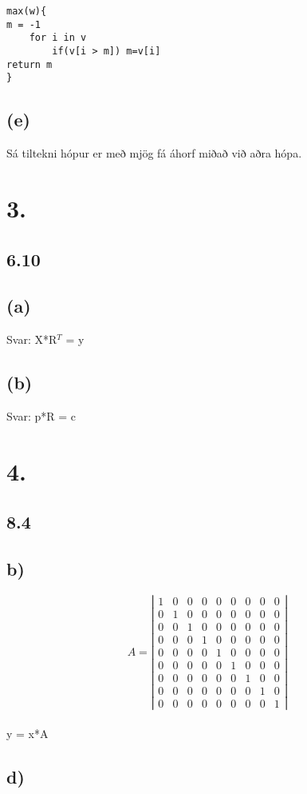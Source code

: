 \documentclass[]{article}
\begin{document}
\begin{lstlisting}
max(w){
m = -1
	for i in v 	
		if(v[i > m]) m=v[i]
return m
}
\end{lstlisting}


\pagebreak

\subsection*{(e)}
Sá tiltekni hópur er með mjög fá áhorf miðað við aðra hópa.


\section*{3.}

\subsection*{6.10}

\subsection*{(a)}

Svar: X*R$ ^{T} $ = y

\subsection*{(b)}

Svar: p*R = c

\section*{4.}

\subsection*{8.4}

\subsection*{b)}

 
\[ A = \left| \begin{array}{ccccccccc}
1 & 0 & 0 & 0 & 0 & 0 & 0 & 0 & 0 \\
0 & 1 & 0 & 0 & 0 & 0 & 0 & 0 & 0 \\
0 & 0 & 1 & 0 & 0 & 0 & 0 & 0 & 0 \\
0 & 0 & 0 & 1 & 0 & 0 & 0 & 0 & 0 \\
0 & 0 & 0 & 0 & 1 & 0 & 0 & 0 & 0 \\
0 & 0 & 0 & 0 & 0 & 1 & 0 & 0 & 0 \\
0 & 0 & 0 & 0 & 0 & 0 & 1 & 0 & 0 \\
0 & 0 & 0 & 0 & 0 & 0 & 0 & 1 & 0 \\
0 & 0 & 0 & 0 & 0 & 0 & 0 & 0 & 1 

\end{array} \right|\] 
\\

y = x*A

\subsection*{d)}
\end{document}
